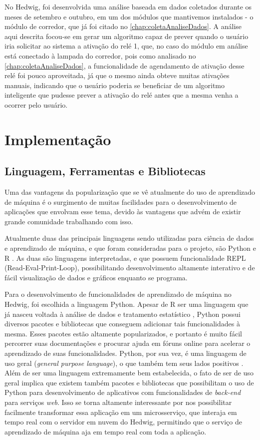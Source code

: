 		No Hedwig, foi desenvolvida uma análise baseada em dados coletados durante os meses de setembro e outubro, em um dos módulos que mantivemos instalados - o módulo de corredor, que já foi citado no \ref{chap:coletaAnaliseDados}. A análise aqui descrita focou-se em gerar um algoritmo capaz de prever quando o usuário iria solicitar ao sistema a ativação do relé 1, que, no caso do módulo em análise está conectado à lampada do corredor, pois como analisado no \ref{chap:coletaAnaliseDados}, a funcionalidade de agendamento de ativação desse relé foi pouco aproveitada, já que o mesmo ainda obteve muitas ativações manuais, indicando que o usuário poderia se beneficiar de um algoritmo inteligente que pudesse prever a ativação do relé antes que a mesma venha a ocorrer pelo usuário.

	\section{Implementação}

		\subsection{Linguagem, Ferramentas e Bibliotecas}

			Uma das vantagens da popularização que se vê atualmente do uso de aprendizado de máquina é o surgimento de muitas facilidades para o desenvolvimento de aplicações que envolvam esse tema, devido às vantagens que advém de existir grande comunidade trabalhando com isso.

			Atualmente duas das principais linguagens sendo utilizadas para ciência de dados e aprendizado de máquina, e que foram consideradas para o projeto, são Python e R \cite{languagesForML}. As duas são linguagens interpretadas, e que possuem funcionalidade REPL (Read-Eval-Print-Loop), possibilitando desenvolvimento altamente interativo e de fácil visualização de dados e gráficos enquanto se programa.

			Para o desenvolvimento de funcionalidades de aprendizado de máquina no Hedwig, foi escolhida a linguagem Python. Apesar de R ser uma linguagem que já nasceu voltada à análise de dados e tratamento estatístico \cite{rLanguage}, Python possui diversos pacotes e bibliotecas que conseguem adicionar tais funcionalidades à mesma. Esses pacotes estão altamente popularizados, e portanto é muito fácil percorrer suas documentações e procurar ajuda em fóruns online para acelerar o aprendizado de suas funcionalidades. Python, por sua vez, é uma linguagem de uso geral (\emph{general purpose language}), o que também tem seus lados positivos \cite{pythonApplications}. Além de ser uma linguagem extremamente bem estabelecida, o fato de ser de uso geral implica que existem também pacotes e bibliotecas que possibilitam o uso de Python para desenvolvimento de aplicativos com funcionalidades de \emph{back-end} para serviços \emph{web}. Isso se torna altamente interessante por nos possibilitar facilmente transformar essa aplicação em um microsserviço, que interaja em tempo real com o servidor em nuvem do Hedwig, permitindo que o serviço de aprendizado de máquina aja em tempo real com toda a aplicação.

